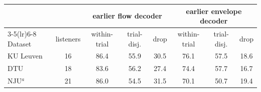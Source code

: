 \begin{tabular}{lccccccc}\toprule
& & \multicolumn{3}{c}{earlier flow decoder} & \multicolumn{3}{c}{earlier envelope decoder} \\
\cmidrule(lr){3-5}\cmidrule(lr){6-8}
Dataset & listeners & within-trial & trial-disj. & drop & within-trial & trial-disj. & drop \\\midrule
KU Leuven & 16 & 86.4 & 55.9 & 30.5 & 76.1 & 57.5 & 18.6 \\
DTU & 18 & 83.6 & 56.2 & 27.4 & 74.4 & 57.7 & 16.7 \\
NJU$^a$ & 21 & 86.0 & 54.5 & 31.5 & 70.1 & 50.7 & 19.4 \\
\bottomrule\end{tabular}

